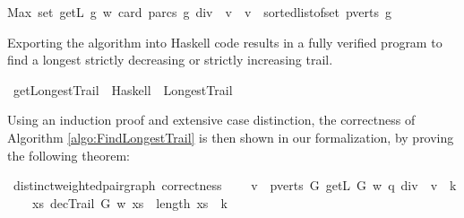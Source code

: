 \begin{isabellebody}
Max\ {\isacharparenleft}set\ {\isacharbrackleft}{\isacharparenleft}getL\ g\ w\ {\isacharparenleft}card\ {\isacharparenleft}parcs\ g{\isacharparenright}\ div\ {}{\isacharparenright}\ v{\isacharparenright}\ {\isachardot}\ v\ {\isacharless}{\isacharminus}\ sorted{\isacharunderscore}list{\isacharunderscore}of{\isacharunderscore}set\ {\isacharparenleft}pverts\ g{\isacharparenright}{\isacharbrackright}{\isacharparenright}{\isachardoublequoteclose}%
\begin{isamarkuptext}%
Exporting the algorithm into Haskell code results in a fully verified program to find a longest
strictly decreasing or strictly increasing trail.%
\end{isamarkuptext}\isamarkuptrue%
\isamarkupfalse%
\ getLongestTrail\ \ Haskell\ \ LongestTrail\isanewline
%
\isadelimproof
%
\endisadelimproof
%
\isatagproof
%
\endisatagproof
{\isafoldproof}%
%
\isadelimproof
%
\endisadelimproof
%
\isadelimproof
%
\endisadelimproof
%
\isatagproof
%
\endisatagproof
{\isafoldproof}%
%
\isadelimproof
%
\endisadelimproof
%
\isadelimproof
%
\endisadelimproof
%
\isatagproof
%
\endisatagproof
{\isafoldproof}%
%
\isadelimproof
%
\endisadelimproof
%
\isadelimproof
%
\endisadelimproof
%
\isatagproof
%
\endisatagproof
{\isafoldproof}%
%
\isadelimproof
%
\endisadelimproof
%
\begin{isamarkuptext}%
Using an induction proof and extensive case distinction, the correctness of Algorithm \ref{algo:FindLongestTrail} 
is then shown in our formalization, by proving the following theorem:%
\end{isamarkuptext}\isamarkuptrue%
\isamarkupfalse%
{\isacharparenleft}\ distinct{\isacharunderscore}weighted{\isacharunderscore}pair{\isacharunderscore}graph{\isacharparenright}\ correctness{\isacharcolon}\isanewline
\ \ \ {\isachardoublequoteopen}{\isasymexists}\ v\ {\isasymin}\ {\isacharparenleft}pverts\ G{\isacharparenright}{\isachardot}\ getL\ G\ w\ {\isacharparenleft}q\ div\ {}{\isacharparenright}\ v\ {\isacharequal}\ k{\isachardoublequoteclose}\isanewline
\ \ \ {\isachardoublequoteopen}{\isasymexists}\ xs{\isachardot}\ decTrail\ G\ w\ xs\ {\isasymand}\ length\ xs\ {\isacharequal}\ k{\isachardoublequoteclose}%
\isadelimproof
%
\endisadelimproof
%
\isatagproof
%
\endisatagproof
{\isafoldproof}%
%
\isadelimproof
%
\endisadelimproof
%
\isadelimproof
%
\endisadelimproof
%
\isatagproof
%
\endisatagproof

\end{isabellebody}
